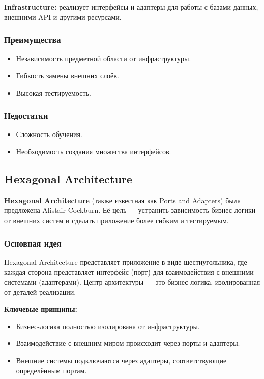 \textbf{Infrastructure:} реализует интерфейсы и адаптеры для работы с базами данных, внешними API и другими ресурсами.

\subsubsection{Преимущества}
\begin{itemize}
    \item Независимость предметной области от инфраструктуры.
    \item Гибкость замены внешних слоёв.
    \item Высокая тестируемость.
\end{itemize}

\subsubsection{Недостатки}
\begin{itemize}
    \item Сложность обучения.
    \item Необходимость создания множества интерфейсов.
\end{itemize}

\subsection{Hexagonal Architecture}
\textbf{Hexagonal Architecture} (также известная как Ports and Adapters) была предложена Alistair Cockburn\cite{cockburn2005hexagonal}. Её цель — устранить зависимость бизнес-логики от внешних систем и сделать приложение более гибким и тестируемым.

\subsubsection{Основная идея}
Hexagonal Architecture представляет приложение в виде шестиугольника\cite{garg2022demystifying}, где каждая сторона представляет интерфейс (порт) для взаимодействия с внешними системами (адаптерами). Центр архитектуры — это бизнес-логика, изолированная от деталей реализации.

\textbf{Ключевые принципы:}
\begin{itemize}
    \item Бизнес-логика полностью изолирована от инфраструктуры.
    \item Взаимодействие с внешним миром происходит через порты и адаптеры.
    \item Внешние системы подключаются через адаптеры, соответствующие определённым портам.
\end{itemize}

